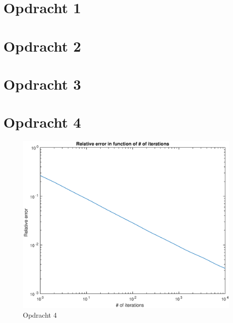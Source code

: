 \documentclass[11pt,a4paper]{article}
\begin{document}
\begin{titlepage}

\vfill %

\end{titlepage}

\section*{Opdracht 1}



\section*{Opdracht 2}



\section*{Opdracht 3}


\section*{Opdracht 4}

\begin{figure}[H]
\centering
\includegraphics[scale=0.55]{opdracht4}
\caption{Opdracht 4}
\end{figure}
\end{document}
